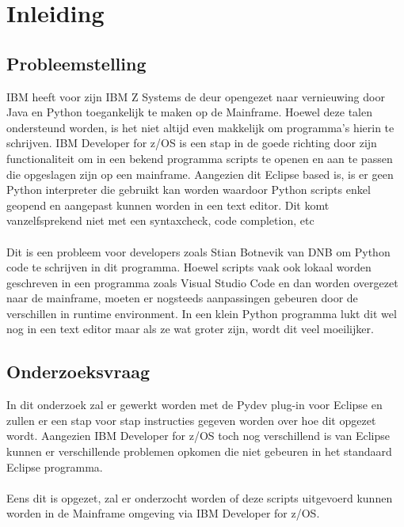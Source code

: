 
\chapter{Inleiding}%
\label{ch:inleiding}

\section{Probleemstelling}%
\label{sec:probleemstelling}
IBM heeft voor zijn IBM Z Systems de deur opengezet naar vernieuwing door Java en Python toegankelijk te maken op de Mainframe. Hoewel deze talen ondersteund worden, is het niet altijd even makkelijk om programma's hierin te schrijven. IBM Developer for z/OS is een stap in de goede richting door zijn functionaliteit om in een bekend programma scripts te openen en aan te passen die opgeslagen zijn op een mainframe. Aangezien dit Eclipse based is, is er geen Python interpreter die gebruikt kan worden waardoor Python scripts enkel geopend en aangepast kunnen worden in een text editor. Dit komt vanzelfsprekend niet met een syntaxcheck, code completion, etc \\ \\
Dit is een probleem voor developers zoals Stian Botnevik van DNB om Python code te schrijven in dit programma. Hoewel scripts vaak ook  lokaal worden geschreven in een programma zoals Visual Studio Code en dan worden overgezet naar de mainframe, moeten er nogsteeds aanpassingen gebeuren door de verschillen in runtime environment. In een klein Python programma lukt dit wel nog in een text editor maar als ze wat groter zijn, wordt dit veel moeilijker.


\section{Onderzoeksvraag}%
\label{sec:onderzoeksvraag}

In dit onderzoek zal er gewerkt worden met de Pydev plug-in voor Eclipse en zullen er een stap voor stap instructies gegeven worden over hoe dit opgezet wordt. Aangezien IBM Developer for z/OS toch nog verschillend is van Eclipse kunnen er verschillende problemen opkomen die niet gebeuren in het standaard Eclipse programma. \\ \\
Eens dit is opgezet, zal er onderzocht worden of deze scripts uitgevoerd kunnen worden  in de Mainframe omgeving via IBM Developer for z/OS.


